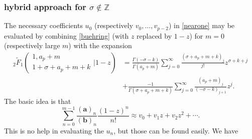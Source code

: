 \documentclass[12pt]{article}
\numberwithin{equation}{section}
\begin{document}
\subsubsection{hybrid approach for $\sigma \not \in \mathbb{Z}$}
The necessary coefficients $u_0$ (respectively $v_0,\dots,v_{p-2}$) in \eqref{nearone} may be evaluated by combining \eqref{buehring} (with $z$ replaced by $1-z$) for $m=0$ (respectively large $m$) with the expansion
\begin{equation}
\label{2f1nearone}
\begin{aligned}
{}_2\tilde{F}_1\left(\begin{array}{c} 1,a_p+m \\ 1+\sigma+a_p+m+k \end{array} \Big| 1-z\right) &= \frac{\Gamma (-\sigma-k)}{\Gamma (a_p+m)} \sum_{j=0}^{\infty} \frac{(\sigma+a_p+m+k)_j}{j!}z^{\sigma+k+j}\\
&+\frac{-1}{\Gamma
   \left(\sigma+a_p+m+k\right)} \sum_{j=0}^{\infty} \frac{(a_p+m)_j}{(-\sigma-k)_{j+1}} z^j\text{.}
\end{aligned}
\end{equation}
The basic idea is that
\begin{equation}
\label{viapprox}
\sum_{n=0}^{m-1} \frac{(\mathbf a)_n}{(\mathbf b)_n}\frac{(1-z)^n}{n!} \approx v_0 + v_1 z + v_2 z^2 + \cdots\text{.}
\end{equation}
This is no help in evaluating the $u_n$, but those can be found easily. We have
\end{document}
